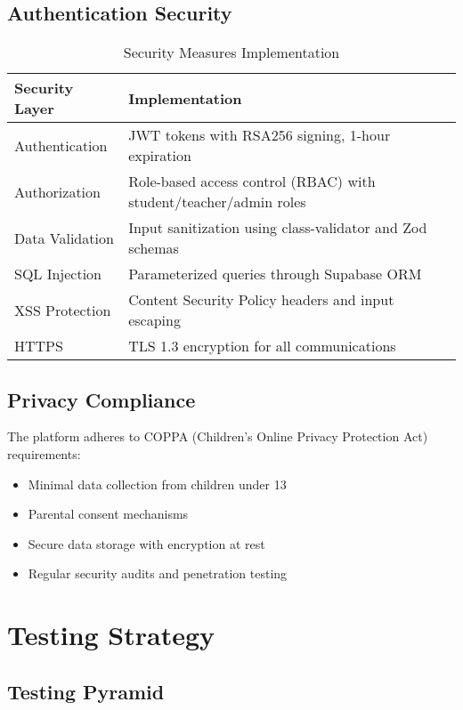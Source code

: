 \documentclass[12pt,a4paper]{article}
\begin{document}
\subsection{Authentication Security}

\begin{table}[H]
\centering
\caption{Security Measures Implementation}
\begin{tabular}{|l|p{8cm}|}
\hline
\textbf{Security Layer} & \textbf{Implementation} \\
\hline
Authentication & JWT tokens with RSA256 signing, 1-hour expiration \\
\hline
Authorization & Role-based access control (RBAC) with student/teacher/admin roles \\
\hline
Data Validation & Input sanitization using class-validator and Zod schemas \\
\hline
SQL Injection & Parameterized queries through Supabase ORM \\
\hline
XSS Protection & Content Security Policy headers and input escaping \\
\hline
HTTPS & TLS 1.3 encryption for all communications \\
\hline
\end{tabular}
\label{tab:security}
\end{table}

\subsection{Privacy Compliance}

The platform adheres to COPPA (Children's Online Privacy Protection Act) requirements:

\begin{itemize}
    \item Minimal data collection from children under 13
    \item Parental consent mechanisms
    \item Secure data storage with encryption at rest
    \item Regular security audits and penetration testing
\end{itemize}

\section{Testing Strategy}

\subsection{Testing Pyramid}
\end{document}
